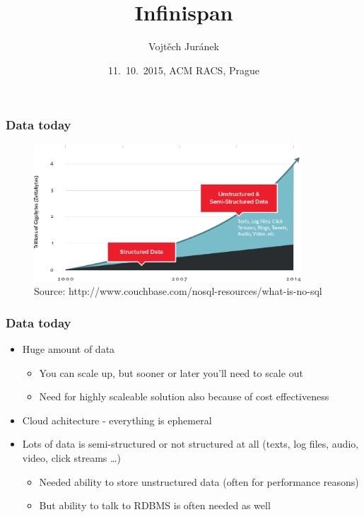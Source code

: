 \documentclass[10pt,utf8]{beamer}
\title{Infinispan}
\author{Vojtěch Juránek}
\institute[Red Hat]{JBoss - a division by Red Hat}
\date{11.~10.~2015, ACM RACS, Prague}
\begin{document}


\begin{frame}
 \titlepage
\end{frame}

\begin{frame}
	\frametitle{Data today}
	\begin{figure}
		\centering
		\includegraphics[width=10cm]{./img/why-nosql-2.eps}
		\caption{\tiny{Source: http://www.couchbase.com/nosql-resources/what-is-no-sql}}
	\end{figure}
\end{frame}

\begin{frame}
	\frametitle{Data today}
	\begin{itemize}
		\item Huge amount of data
		\begin{itemize}
			\item You can scale up, but sooner or later you'll need to scale out
			\item Need for highly scaleable solution also because of cost effectiveness
		\end{itemize}
		\item Cloud achitecture - everything is ephemeral
		\item Lots of data is semi-structured or not structured at all (texts, log files, audio, video, click streams \dots)
		\begin{itemize}
			\item Needed ability to store unstructured data (often for performance reasons)
			\item But ability  to talk to RDBMS is often needed as well
		\end{itemize}
	\end{itemize}
\end{frame}
\end{document}
